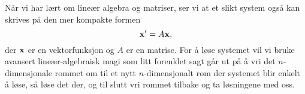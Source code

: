 Når vi har lært om lineær algebra og matriser, ser vi at et slikt
system også kan skrives på den mer kompakte formen
\[
\mathbf{x}' = A \mathbf{x},
\]
der $\mathbf{x}$ er en vektorfunksjon og $A$ er en matrise.  For å løse
systemet vil vi bruke avansert lineær-algebraisk magi som litt
forenklet sagt går ut på å vri det $n$-dimensjonale rommet om til et
nytt $n$-dimensjonalt rom der systemet blir enkelt å løse, så løse det
der, og til slutt vri rommet tilbake og ta løsningene med oss.

\kapittelslutt
